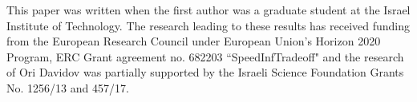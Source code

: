 \documentclass[twoside,11pt]{article}
\begin{document}
        
        
        


\acks This paper was written when the first author was a graduate student at the Israel Institute of Technology. The research leading to these results has received funding from the European Research Council under European Union's Horizon 2020 Program, ERC Grant agreement no. 682203 ``SpeedInfTradeoff" and the research of Ori Davidov was partially supported by the Israeli Science Foundation Grants No. 1256/13 and 457/17.
\end{document}
